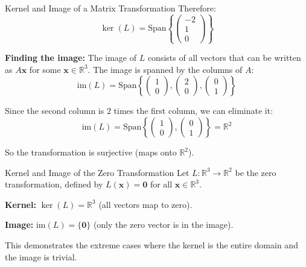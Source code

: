 \documentclass[12pt,a4paper]{article}
\newcommand{\R}{\mathbb{R}}
\newcommand{\vv}[1]{\mathbf{#1}}
\newcommand{\vzero}{\mathbf{0}}
\newcommand{\Span}{\text{Span}}
\newcommand{\im}{\text{im}}
\begin{document}
\begin{example}{Kernel and Image of a Matrix Transformation}
		Therefore:
		\[
		\ker(L) = \Span\left\{\begin{pmatrix} -2 \\ 1 \\ 0 \end{pmatrix}\right\}
		\]
		
		\textbf{Finding the image:} The image of $L$ consists of all vectors that can be written as $A\vv{x}$ for some $\vv{x} \in \R^3$. The image is spanned by the columns of $A$:
		\[
		\im(L) = \Span\left\{\begin{pmatrix} 1 \\ 0 \end{pmatrix}, \begin{pmatrix} 2 \\ 0 \end{pmatrix}, \begin{pmatrix} 0 \\ 1 \end{pmatrix}\right\}
		\]
		
		Since the second column is $2$ times the first column, we can eliminate it:
		\[
		\im(L) = \Span\left\{\begin{pmatrix} 1 \\ 0 \end{pmatrix}, \begin{pmatrix} 0 \\ 1 \end{pmatrix}\right\} = \R^2
		\]
		
		So the transformation is surjective (maps onto $\R^2$).
	\end{example}
	
	\begin{example}{Kernel and Image of the Zero Transformation}
		Let $L: \R^3 \to \R^2$ be the zero transformation, defined by $L(\vv{x}) = \vzero$ for all $\vv{x} \in \R^3$.
		
		\textbf{Kernel:} $\ker(L) = \R^3$ (all vectors map to zero).
		
		\textbf{Image:} $\im(L) = \{\vzero\}$ (only the zero vector is in the image).
		
		This demonstrates the extreme cases where the kernel is the entire domain and the image is trivial.
	\end{example}
	
\end{document}
